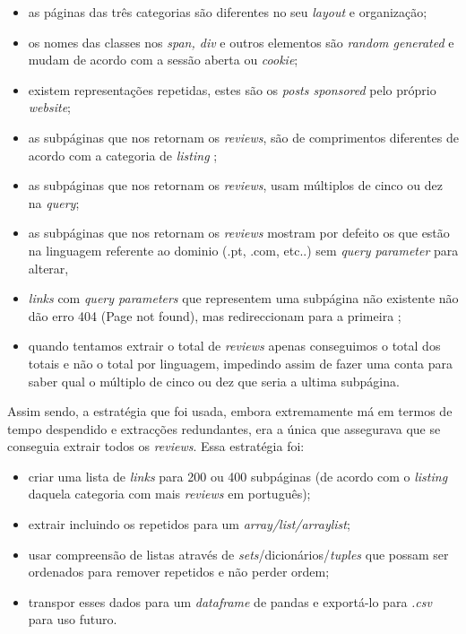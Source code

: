 \begin{itemize}
  \item as páginas das três categorias são diferentes no seu \textit{layout} e organização;
  \item os nomes das classes nos \textit{span, div} e outros elementos são \textit{random generated} e mudam de acordo com a sessão aberta ou \textit{cookie};
  \item existem representações repetidas, estes são os \textit{posts sponsored} \cite{wws1} pelo próprio \textit{website};
  \item as subpáginas que nos retornam os \textit{reviews}, são de comprimentos diferentes de acordo com a categoria de \textit{listing} \cite{wws2};
  \item as subpáginas que nos retornam os \textit{reviews}, usam múltiplos de cinco ou dez na \textit{query};
  \item as subpáginas que nos retornam os \textit{reviews} mostram por defeito os que estão na linguagem referente ao dominio (.pt, .com, etc..) sem \textit{query parameter} para alterar,
  \item \textit{links} com \textit{query parameters} que representem uma subpágina não existente não dão erro 404 (Page not found), mas redireccionam para a primeira \cite{wws2};
  \item quando tentamos extrair o total de \textit{reviews} apenas conseguimos o total dos totais e não o total por linguagem, impedindo assim de fazer uma conta para saber qual o múltiplo de cinco ou dez que seria a ultima subpágina.
\end{itemize}

Assim sendo, a estratégia que foi usada, embora extremamente má em termos de tempo despendido e extracções redundantes, era a única que assegurava que se conseguia extrair todos os \textit{reviews}. Essa estratégia foi:

\begin{itemize}
  \item criar uma lista de \textit{links} para 200 ou 400 subpáginas (de acordo com o \textit{listing} daquela categoria com mais \textit{reviews} em português);
  \item extrair incluindo os repetidos para um \textit{array/list/arraylist};
  \item usar compreensão de listas através de \textit{sets}/dicionários/\textit{tuples} que possam ser ordenados para remover repetidos e não perder ordem;
  \item transpor esses dados para um \textit{dataframe} de pandas e exportá-lo para \textit{.csv} para uso futuro.
\end{itemize}

